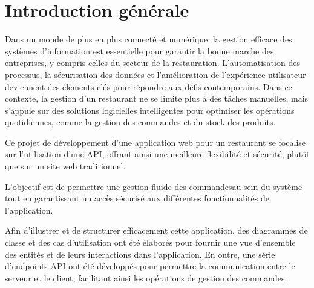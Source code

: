 \chapter*{Introduction générale}


Dans un monde de plus en plus connecté et numérique, la gestion efficace des systèmes d'information est essentielle pour garantir la bonne marche des entreprises, y compris celles du secteur de la restauration. L'automatisation des processus, la sécurisation des données et l'amélioration de l'expérience utilisateur deviennent des éléments clés pour répondre aux défis contemporains. Dans ce contexte, la gestion d'un restaurant ne se limite plus à des tâches manuelles, mais s'appuie sur des solutions logicielles intelligentes pour optimiser les opérations quotidiennes, comme la gestion des commandes et du stock des produits.

Ce projet de développement d'une application web pour un restaurant se focalise sur l'utilisation d'une API, offrant ainsi une meilleure flexibilité et sécurité, plutôt que sur un site web traditionnel. 

L'objectif est de permettre une gestion fluide des commandesau sein du système tout en garantissant un accès sécurisé aux différentes fonctionnalités de l'application. 

Afin d’illustrer et de structurer efficacement cette application, des diagrammes de classe et des cas d’utilisation ont été élaborés pour fournir une vue d'ensemble des entités et de leurs interactions dans l’application. En outre, une série d'endpoints API ont été développés pour permettre la communication entre le serveur et le client, facilitant ainsi les opérations de gestion des commandes.
